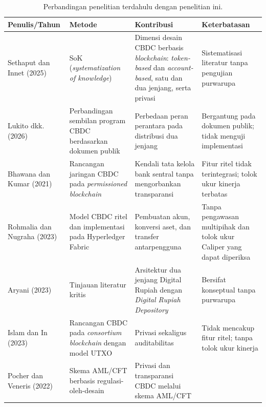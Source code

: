 \begin{table}[htbp]
  \caption{Perbandingan penelitian terdahulu dengan penelitian ini.}
  \vspace{0.5em}
  \centering
  \begingroup
  \renewcommand{\arraystretch}{1.25}
  \setlength{\tabcolsep}{3pt}
  \small
  \begin{tabular}{>{\RaggedRight\arraybackslash}p{}
                  >{\RaggedRight\arraybackslash}p{}
                  >{\RaggedRight\arraybackslash}p{}
                  >{\RaggedRight\arraybackslash}p{}}
    \toprule
    \textbf{Penulis/Tahun} & \textbf{Metode} & \textbf{Kontribusi} & \textbf{Keterbatasan} \\
    \midrule
    Sethaput dan Innet (2025)~\cite{sethaput2025} &
    SoK (\textit{systematization of knowledge}) &
    Dimensi desain CBDC berbasis \textit{blockchain}: \textit{token-based} dan \textit{account-based}, satu dan dua jenjang, serta privasi &
    Sistematisasi literatur tanpa pengujian purwarupa \\
    Lukito dkk. (2026)~\cite{lukito2026governance} &
    Perbandingan sembilan program CBDC berdasarkan dokumen publik &
    Perbedaan peran perantara pada distribusi dua jenjang &
    Bergantung pada dokumen publik; tidak menguji implementasi \\
    Bhawana dan Kumar (2021)~\cite{bhawana2021} &
    Rancangan jaringan CBDC pada \textit{permissioned blockchain} &
    Kendali tata kelola bank sentral tanpa mengorbankan transparansi &
    Fitur ritel tidak terintegrasi; tolok ukur kinerja terbatas \\
    Rohmalia dan Nugraha (2023)~\cite{rohmalia2023retail} &
    Model CBDC ritel dan implementasi pada Hyperledger Fabric &
    Pembuatan akun, konversi aset, dan transfer antarpengguna &
    Tanpa pengawasan multipihak dan tolok ukur Caliper yang dapat diperiksa \\
    Aryani (2023)~\cite{aryani2023critlit} &
    Tinjauan literatur kritis &
    Arsitektur dua jenjang Digital Rupiah dengan \textit{Digital Rupiah Depository} &
    Bersifat konseptual tanpa purwarupa \\
    Islam dan In (2023)~\cite{islam2023} &
    Rancangan CBDC pada \textit{consortium blockchain} dengan model UTXO &
    Privasi sekaligus auditabilitas &
    Tidak mencakup fitur ritel; tanpa tolok ukur kinerja \\
    Pocher dan Veneris (2022)~\cite{Pocher2022Privacy} &
    Skema AML/CFT berbasis regulasi-oleh-desain &
    Privasi dan transparansi CBDC melalui skema AML/CFT &

\end{tabular}
\end{table}

